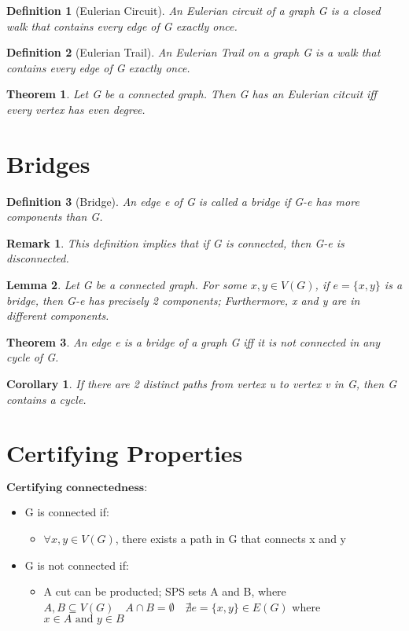 \documentclass[11pt, oneside]{book}
\theoremstyle{break}
\newtheorem{thm}{Theorem}[section]
\newtheorem{crly}{Corollary}[thm]
\newtheorem{lemma}[thm]{Lemma}
\newtheorem{defn}{Definition}[section]
\newtheorem*{remark}{Remark}
\begin{document}
\begin{defn}[Eulerian Circuit]
	An Eulerian circuit of a graph G is a closed walk that contains every edge of G exactly once.
\end{defn}

\begin{defn}[Eulerian Trail]
	An Eulerian Trail on a graph G is a walk that contains every edge of G exactly once.
\end{defn}

\begin{thm}
	Let G be a connected graph. Then G has an Eulerian citcuit iff every vertex has even degree.
\end{thm}


\section{Bridges}

\begin{defn}[Bridge]
	An edge e of G is called a bridge if G-e has more components than G.
\end{defn}

\begin{remark}
	This definition implies that if G is connected, then G-e is disconnected.
\end{remark}

\begin{lemma}
	Let G be a connected graph. For some $x, y \in V(G)$, if $e=\{x, y\}$ is a bridge, then G-e has precisely 2 components; Furthermore, x and y are in different components.
\end{lemma}

\begin{thm}
	An edge e is a bridge of a graph G iff it is not connected in any cycle of G.
\end{thm}

\begin{crly}
	If there are 2 distinct paths from vertex u to vertex v in G, then G contains a cycle.
\end{crly}


\section{Certifying Properties}
$\textbf{Certifying connectedness:}$
\begin{itemize}
	\item G is connected if:
	\begin{itemize}
		\item $\forall x,y \in V(G)$, there exists a path in G that connects x and y
	\end{itemize}
	\item G is not connected if:
	\begin{itemize}
		\item A cut can be producted; SPS sets A and B, where $A, B \subseteq V(G) \quad A \cap B = \emptyset \quad \nexists e = \{x, y\} \in E(G)$ where $x \in A \text{ and } y \in B$
	\end{itemize}
\end{itemize}
\end{document}
